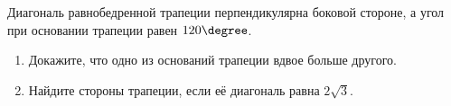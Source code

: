 \begin{ex}
	\begin{condition}
		Диагональ равнобедренной трапеции перпендикулярна боковой стороне, а угол при основании трапеции равен \( 120\degree \).
		\begin{enumerate}
			\item Докажите, что одно из оснований трапеции вдвое больше другого.
			\item Найдите стороны трапеции, если её диагональ равна \( 2\sqrt{3} \).
		\end{enumerate} 
	\end{condition}
\end{ex}